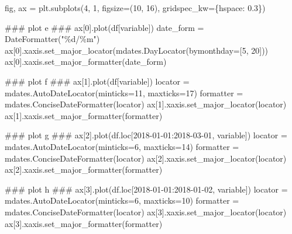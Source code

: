 \documentclass[
  letterpaper,
  DIV=11,
  numbers=noendperiod]{scrreprt}
\newenvironment{Shaded}{\begin{snugshade}}{\end{snugshade}}
\newcommand{\AlertTok}[1]{\textcolor[rgb]{0.68,0.00,0.00}{#1}}
\newcommand{\CommentTok}[1]{\textcolor[rgb]{0.37,0.37,0.37}{#1}}
\newcommand{\DecValTok}[1]{\textcolor[rgb]{0.68,0.00,0.00}{#1}}
\newcommand{\FloatTok}[1]{\textcolor[rgb]{0.68,0.00,0.00}{#1}}
\newcommand{\NormalTok}[1]{\textcolor[rgb]{0.00,0.23,0.31}{#1}}
\newcommand{\OperatorTok}[1]{\textcolor[rgb]{0.37,0.37,0.37}{#1}}
\newcommand{\SpecialCharTok}[1]{\textcolor[rgb]{0.37,0.37,0.37}{#1}}
\newcommand{\StringTok}[1]{\textcolor[rgb]{0.13,0.47,0.30}{#1}}
\begin{document}
\begin{Shaded}
\begin{Highlighting}[]
\NormalTok{fig, ax }\OperatorTok{=}\NormalTok{ plt.subplots(}\DecValTok{4}\NormalTok{, }\DecValTok{1}\NormalTok{, figsize}\OperatorTok{=}\NormalTok{(}\DecValTok{10}\NormalTok{, }\DecValTok{16}\NormalTok{),}
\NormalTok{                       gridspec\_kw}\OperatorTok{=}\NormalTok{\{}\StringTok{\textquotesingle{}hspace\textquotesingle{}}\NormalTok{: }\FloatTok{0.3}\NormalTok{\})}

\CommentTok{\#\#\# plot e }\AlertTok{\#\#\#}
\NormalTok{ax[}\DecValTok{0}\NormalTok{].plot(df[}\StringTok{\textquotesingle{}variable\textquotesingle{}}\NormalTok{])}
\NormalTok{date\_form }\OperatorTok{=}\NormalTok{ DateFormatter(}\StringTok{"}\SpecialCharTok{\%d}\StringTok{/\%m"}\NormalTok{)}
\NormalTok{ax[}\DecValTok{0}\NormalTok{].xaxis.set\_major\_locator(mdates.DayLocator(bymonthday}\OperatorTok{=}\NormalTok{[}\DecValTok{5}\NormalTok{, }\DecValTok{20}\NormalTok{]))}
\NormalTok{ax[}\DecValTok{0}\NormalTok{].xaxis.set\_major\_formatter(date\_form)}

\CommentTok{\#\#\# plot f }\AlertTok{\#\#\#}
\NormalTok{ax[}\DecValTok{1}\NormalTok{].plot(df[}\StringTok{\textquotesingle{}variable\textquotesingle{}}\NormalTok{])}
\NormalTok{locator }\OperatorTok{=}\NormalTok{ mdates.AutoDateLocator(minticks}\OperatorTok{=}\DecValTok{11}\NormalTok{, maxticks}\OperatorTok{=}\DecValTok{17}\NormalTok{)}
\NormalTok{formatter }\OperatorTok{=}\NormalTok{ mdates.ConciseDateFormatter(locator)}
\NormalTok{ax[}\DecValTok{1}\NormalTok{].xaxis.set\_major\_locator(locator)}
\NormalTok{ax[}\DecValTok{1}\NormalTok{].xaxis.set\_major\_formatter(formatter)}

\CommentTok{\#\#\# plot g }\AlertTok{\#\#\#}
\NormalTok{ax[}\DecValTok{2}\NormalTok{].plot(df.loc[}\StringTok{\textquotesingle{}2018{-}01{-}01\textquotesingle{}}\NormalTok{:}\StringTok{\textquotesingle{}2018{-}03{-}01\textquotesingle{}}\NormalTok{, }\StringTok{\textquotesingle{}variable\textquotesingle{}}\NormalTok{])}
\NormalTok{locator }\OperatorTok{=}\NormalTok{ mdates.AutoDateLocator(minticks}\OperatorTok{=}\DecValTok{6}\NormalTok{, maxticks}\OperatorTok{=}\DecValTok{14}\NormalTok{)}
\NormalTok{formatter }\OperatorTok{=}\NormalTok{ mdates.ConciseDateFormatter(locator)}
\NormalTok{ax[}\DecValTok{2}\NormalTok{].xaxis.set\_major\_locator(locator)}
\NormalTok{ax[}\DecValTok{2}\NormalTok{].xaxis.set\_major\_formatter(formatter)}

\CommentTok{\#\#\# plot h }\AlertTok{\#\#\#}
\NormalTok{ax[}\DecValTok{3}\NormalTok{].plot(df.loc[}\StringTok{\textquotesingle{}2018{-}01{-}01\textquotesingle{}}\NormalTok{:}\StringTok{\textquotesingle{}2018{-}01{-}02\textquotesingle{}}\NormalTok{, }\StringTok{\textquotesingle{}variable\textquotesingle{}}\NormalTok{])}
\NormalTok{locator }\OperatorTok{=}\NormalTok{ mdates.AutoDateLocator(minticks}\OperatorTok{=}\DecValTok{6}\NormalTok{, maxticks}\OperatorTok{=}\DecValTok{10}\NormalTok{)}
\NormalTok{formatter }\OperatorTok{=}\NormalTok{ mdates.ConciseDateFormatter(locator)}
\NormalTok{ax[}\DecValTok{3}\NormalTok{].xaxis.set\_major\_locator(locator)}
\NormalTok{ax[}\DecValTok{3}\NormalTok{].xaxis.set\_major\_formatter(formatter)}


\end{Highlighting}
\end{Shaded}
\end{document}
